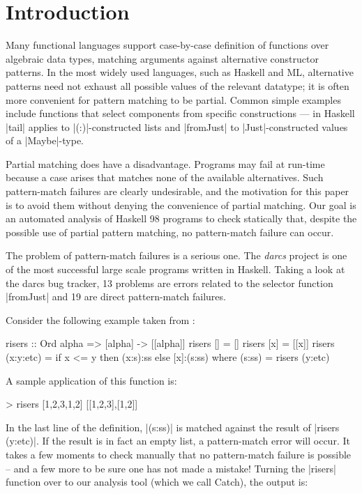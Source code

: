 \documentclass[preprint]{sigplanconf}
\begin{document}
\section{Introduction}
\label{sec:introduction}

Many functional languages support case-by-case definition of functions
over algebraic data types, matching arguments against alternative
constructor patterns.  In the most widely used languages, such as Haskell
and ML, alternative patterns need not exhaust all possible values of
the relevant datatype; it is often more convenient for pattern matching
to be partial.  Common simple examples include functions that select
components from specific constructions --- in Haskell |tail| applies
to |(:)|-constructed lists and |fromJust| to |Just|-constructed values of
a |Maybe|-type.

Partial matching does have a disadvantage.  Programs may fail at run-time
because a case arises that matches none of the available alternatives.
Such pattern-match failures are clearly undesirable, and the motivation
for this paper is to avoid them without denying the convenience of
partial matching.  Our goal is an automated analysis of Haskell 98 programs
to check statically that, despite the possible use of partial pattern
matching, no pattern-match failure can occur.

The problem of pattern-match failures is a serious one. The \textit{darcs} project \cite{darcs} is one of the most successful large scale programs written in Haskell. Taking a look at the darcs bug tracker, 13 problems are errors related to the selector function |fromJust| and 19 are direct pattern-match failures.

Consider the following example taken from \citet{me:catch_tfp}:

\begin{code}
risers :: Ord alpha => [alpha] -> [[alpha]]
risers [] = []
risers [x] = [[x]]
risers (x:y:etc) = if x <= y then (x:s):ss else [x]:(s:ss)
    where (s:ss) = risers (y:etc)
\end{code}

\noindent A sample application of this function is:

\ignore\begin{code}
> risers [1,2,3,1,2]
[[1,2,3],[1,2]]
\end{code}

\noindent In the last line of the definition, |(s:ss)| is matched against the result of |risers (y:etc)|. If the result is in fact an empty list, a pattern-match error will occur. It takes a few moments to check manually that no pattern-match failure is possible -- and a few more to be sure one has not made a mistake! Turning the |risers| function over to our analysis tool (which we call Catch), the output is:
\end{document}
